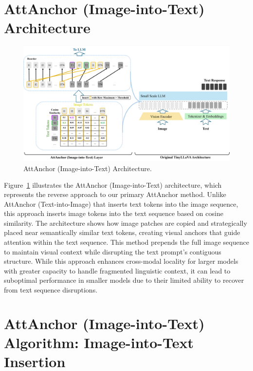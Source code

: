 \documentclass[11pt]{article}
\begin{document}
\section{AttAnchor (Image-into-Text) Architecture}
\label{app:image_into_text_arch}

\begin{figure}[H]
    \centering    \includegraphics[width=1.0\linewidth]{Attanchor_I2T_arch.png}
    \caption{AttAnchor (Image-into-Text) Architecture.}
    \label{fig:coser}
\end{figure}

Figure~\ref{fig:coser} illustrates the AttAnchor (Image-into-Text) architecture, which represents the reverse approach to our primary AttAnchor method. Unlike AttAnchor (Text-into-Image) that inserts text tokens into the image sequence, this approach inserts image tokens into the text sequence based on cosine similarity. The architecture shows how image patches are copied and strategically placed near semantically similar text tokens, creating visual anchors that guide attention within the text sequence. This method prepends the full image sequence to maintain visual context while disrupting the text prompt's contiguous structure. While this approach enhances cross-modal locality for larger models with greater capacity to handle fragmented linguistic context, it can lead to suboptimal performance in smaller models due to their limited ability to recover from text sequence disruptions.


\section{AttAnchor (Image-into-Text) Algorithm: Image-into-Text Insertion}
\label{app:alt_algorithm}
\end{document}
